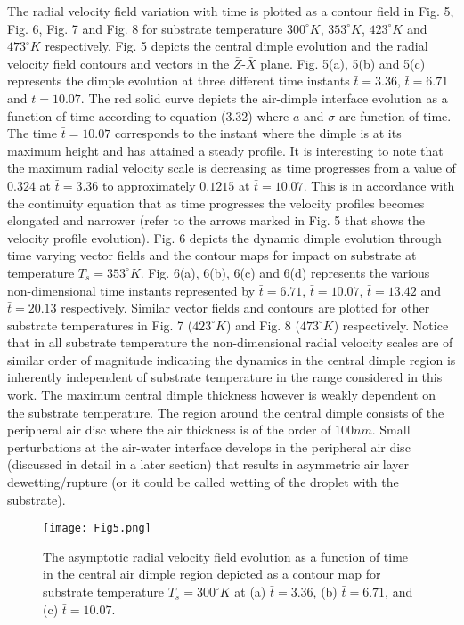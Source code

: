 \documentclass{jfm}
\begin{document}
The radial velocity field variation with time is plotted as a contour field in Fig. 5, Fig. 6, Fig. 7 and Fig. 8 for substrate temperature $300^{\circ}K$, $353^{\circ}K$, $423^{\circ}K$ and $473^{\circ}K$  respectively.
Fig. 5 depicts the central dimple evolution and the radial velocity field contours and vectors in the $\bar{Z}$-$\bar{X}$
plane. Fig. 5(a), 5(b) and 5(c) represents the dimple evolution at three different time instants $\bar{t}=3.36$, $\bar{t}=6.71$ and $\bar{t}=10.07$. The red solid curve depicts the air-dimple interface evolution as a function of time according to equation (3.32) where $a$ and ${\sigma}$ are function of time. The time $\bar{t}=10.07$ corresponds to the instant where the dimple is at its maximum height and has attained a steady profile. It is interesting to note that the maximum radial velocity scale is decreasing as time progresses from a value of $0.324$ at $\bar{t}=3.36$ to approximately $0.1215$ at $\bar{t}=10.07$. This is in accordance with the continuity equation that as time progresses the velocity profiles becomes elongated and narrower (refer to the arrows marked in Fig. 5 that shows the velocity profile evolution). Fig. 6 depicts the dynamic dimple evolution through time varying vector fields and the contour maps for impact on substrate at temperature $T_s=353^{\circ}K$. Fig. 6(a), 6(b), 6(c) and 6(d) represents the various non-dimensional time instants represented by $\bar{t}=6.71$, $\bar{t}=10.07$, $\bar{t}=13.42$ and $\bar{t}=20.13$ respectively. Similar vector fields and contours are plotted for other substrate temperatures in Fig. 7 ($423^{\circ}K$) and Fig. 8 ($473^{\circ}K$) respectively. Notice that in all substrate temperature the non-dimensional radial velocity scales are of similar order of magnitude indicating the dynamics in the central dimple region is inherently independent of substrate temperature in the range considered in this work. 
The maximum central dimple thickness however is weakly dependent on the substrate temperature. The region around the central dimple consists of the peripheral air disc where the air thickness is of the order of $100nm$. Small perturbations at the air-water interface develops in the peripheral air disc (discussed in detail in a later section) that results in asymmetric air layer dewetting/rupture (or it could be called wetting of the droplet with the substrate).
\begin{figure*}
    \centering
    \texttt{[image: Fig5.png]}
    \caption{
    The asymptotic radial velocity field evolution as a function of time in the central air dimple region depicted as a contour map for substrate temperature $T_s=300^{\circ}K$ at (a) $\bar{t}=3.36$, (b) $\bar{t}=6.71$, and (c) $\bar{t}=10.07$.
    }
    \label{Figure5}
\end{figure*}
\end{document}

